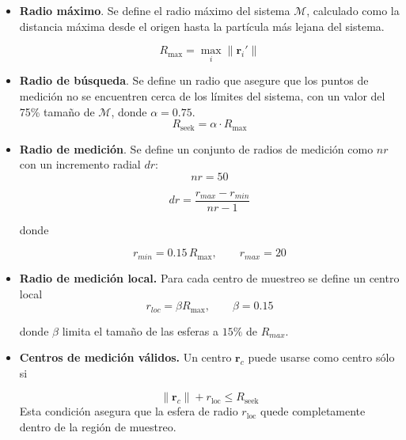 	\begin{itemize}
		
		\item \textbf{Radio máximo}. Se define el radio máximo del sistema $\mathcal{M}$, calculado como la distancia máxima desde el origen hasta la partícula más lejana del sistema.
		
		\begin{equation}
			R_{\text{max}} = \max_i \|\mathbf{r}_i'\|
		\end{equation}
		
		
		
		\item \textbf{Radio de búsqueda}. Se define un radio que asegure que los puntos de medición no se encuentren cerca de los límites del sistema, con un valor del 75\% tamaño de $\mathcal{M}$, donde $\alpha = 0.75$.
		\begin{equation}
			R_{\text{seek}} = \alpha \cdot R_{\text{max}}
		\end{equation}
		
		
		\item \textbf{Radio de medición}. Se define  un conjunto de radios de medición como $nr$ con un incremento radial $dr$:
		\begin{equation}
			nr = 50 
		\end{equation}
		
		\begin{equation}
			dr = \frac{r_{max}-r_{min}}{nr-1}
		\end{equation}
		
		donde 
		
		\begin{equation}
			r_{min} = 0.15\, R_{\text{max}}, \qquad
			r_{max} = 20
		\end{equation}
		
		
		\item \textbf{Radio de medición local.} Para cada centro de muestreo se define
		un centro local
		\begin{equation}
			r_{loc} = \beta R_{\text{max}}, \qquad \beta = 0.15
		\end{equation} 
		
		donde $\beta$ limita el tamaño de las esferas a $15\%$ de $R_{max}$.
		
		\item \textbf{Centros de medición válidos.} 
		Un centro $\mathbf{r}_c$ puede usarse como centro sólo si
		
		\begin{equation}
			\|\mathbf{r}_c\| + r_{\mathrm{loc}} \le R_{\text{seek}}
		\end{equation}
		Esta condición asegura que la esfera de radio $r_{\text{loc}}$ quede completamente dentro de la región de muestreo.
		\end{itemize}

